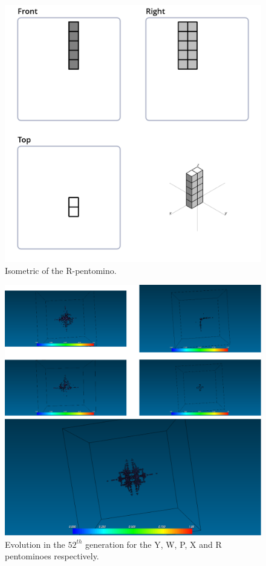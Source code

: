 \begin{figure}
	\centering
	\includegraphics[scale=0.3]{iso_diagrams/o.png}
	\caption{Isometric of the R-pentomino.}
  \label{fig:iso-pent-r}
\end{figure}

\begin{figure}
	\centering
	\includegraphics[scale=0.4]{pentominoes_ss/r-comparative-70g.png}
	\caption{Evolution in the $52^{th}$ generation for the Y, W, P, X and R
	pentominoes respectively.}
  \label{fig:ss-pent:r-comparative}
\end{figure}

